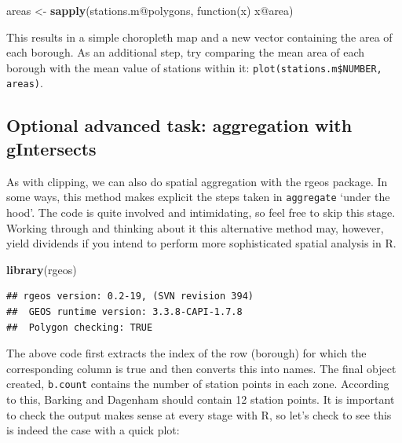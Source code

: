 \documentclass[]{article}
\newenvironment{Shaded}{}{}
\newcommand{\KeywordTok}[1]{\textcolor[rgb]{0.00,0.44,0.13}{\textbf{{#1}}}}
\newcommand{\DataTypeTok}[1]{\textcolor[rgb]{0.56,0.13,0.00}{{#1}}}
\newcommand{\DecValTok}[1]{\textcolor[rgb]{0.25,0.63,0.44}{{#1}}}
\newcommand{\CommentTok}[1]{\textcolor[rgb]{0.38,0.63,0.69}{\textit{{#1}}}}
\newcommand{\NormalTok}[1]{{#1}}
\begin{document}
\begin{Shaded}
\begin{Highlighting}[]
\NormalTok{areas <- }\KeywordTok{sapply}\NormalTok{(stations.m@polygons, function(x) x@area)}
\end{Highlighting}
\end{Shaded}
This results in a simple choropleth map and a new vector containing the
area of each borough. As an additional step, try comparing the mean area
of each borough with the mean value of stations within it:
\texttt{plot(stations.m\$NUMBER, areas)}.

\subsection{Optional advanced task: aggregation with gIntersects}

As with clipping, we can also do spatial aggregation with the rgeos
package. In some ways, this method makes explicit the steps taken in
\texttt{aggregate} `under the hood'. The code is quite involved and
intimidating, so feel free to skip this stage. Working through and
thinking about it this alternative method may, however, yield dividends
if you intend to perform more sophisticated spatial analysis in R.

\begin{Shaded}
\begin{Highlighting}[]
\KeywordTok{library}\NormalTok{(rgeos)}
\end{Highlighting}
\end{Shaded}
\begin{verbatim}
## rgeos version: 0.2-19, (SVN revision 394)
##  GEOS runtime version: 3.3.8-CAPI-1.7.8 
##  Polygon checking: TRUE
\end{verbatim}
\begin{Shaded}
\end{Shaded}
The above code first extracts the index of the row (borough) for which
the corresponding column is true and then converts this into names. The
final object created, \texttt{b.count} contains the number of station
points in each zone. According to this, Barking and Dagenham should
contain 12 station points. It is important to check the output makes
sense at every stage with R, so let's check to see this is indeed the
case with a quick plot:
\end{document}
